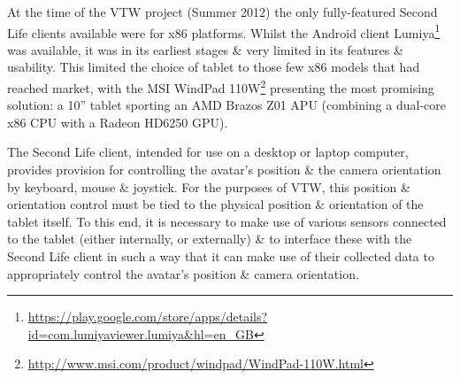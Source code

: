 \label{SecondLifeMobility}

\newcommand{\LumiyaFootnote}{\footnote{\url{https://play.google.com/store/apps/details?id=com.lumiyaviewer.lumiya&hl=en_GB}}}

\newcommand{\WindpadFootnote}{\footnote{\url{http://www.msi.com/product/windpad/WindPad-110W.html}}}


At the time of the VTW project (Summer 2012) the only fully-featured Second Life clients available were for x86 platforms. Whilst the Android client Lumiya\LumiyaFootnote{} was available, it was in its earliest stages \& very limited in its features \& usability. This limited the choice of tablet to those few x86 models that had reached market, with the MSI WindPad 110W\WindpadFootnote{} presenting the most promising solution: a 10'' tablet sporting an AMD Brazos Z01 APU (combining a dual-core x86 CPU with a Radeon HD6250 GPU).

The Second Life client, intended for use on a desktop or laptop computer, provides provision for controlling the avatar's position \& the camera orientation by keyboard, mouse \& joystick. For the purposes of VTW, this position \& orientation control must be tied to the physical position \& orientation of the tablet itself. To this end, it is necessary to make use of various sensors connected to the tablet (either internally, or externally) \& to interface these with the Second Life client in such a way that it can make use of their collected data to appropriately control the avatar's position \& camera orientation.






